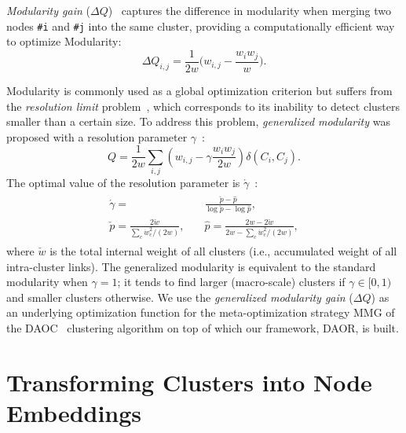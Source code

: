 \documentclass[conference]{IEEEtran}
\newcommand{\sys}{DAOR\xspace}
\begin{document}
\emph{Modularity gain} ($\Delta Q$)~\cite{Bld08} captures the difference in modularity when merging two nodes \verb|#i| and \verb|#j| into the same cluster, providing a computationally efficient way to optimize Modularity:
\begin{equation}
\Delta Q_{i,j} = \frac{1}{2 w} \bigg( w_{i,j} - \frac{w_i w_j}{w} \bigg).
\label{eq:dmod}
\end{equation}


Modularity is commonly used as a global optimization criterion but suffers from the \emph{resolution limit} problem~\cite{Fort07,Good10}, which corresponds to its inability to detect clusters smaller than a certain size. To address this problem,
\emph{generalized modularity} was proposed with a resolution parameter $\gamma$~\cite{Aren08r,Kump07}:  \begin{equation}  Q = \frac{1}{2 w}\sum_{i,j}\left({w_{i,j} - \gamma \frac{w_i w_j}{2 w}}\right)\delta(C_i, C_j).
\label{eq:gmod}
\end{equation}
The optimal value of the resolution parameter is $\acute{\gamma}$~\cite{Newm16}: \begin{align}\begin{split}
\acute{\gamma} = &\frac{\check{p} - \hat{p}}{\log \check{p} - \log \hat{p}},\\
\check{p} = \frac{2 \check{w}}{\sum_{c}\dot{w}^2_c / (2 w)},\quad
&\hat{p} = \frac{2 w - 2 \check{w}}{2 w - \sum_{c}\dot{w}^2_c / (2 w)},
\label{eq:gamma}
\end{split}\end{align}
where $\check{w}$ is the total internal weight of all clusters (i.e., accumulated weight of all intra-cluster links).
The generalized modularity is equivalent to the standard modularity when $\gamma = 1$; it tends to find larger (macro-scale) clusters if $\gamma \in [0, 1)$ and smaller clusters otherwise.
We use the \emph{generalized modularity gain} ($\Delta Q$) as an underlying optimization function for the meta-optimization strategy MMG of the DAOC~\cite{Daoc19} clustering algorithm on top of which our framework, \sys, is built.






\section{Transforming Clusters into Node Embeddings}
\label{sec:dims}
\end{document}
